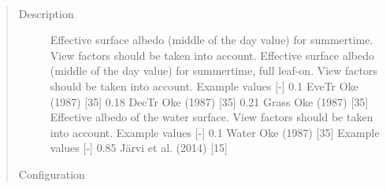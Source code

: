 \documentclass[letterpaper,10pt,english]{sphinxmanual}
\begin{document}
\begin{fulllineitems}
\label{\detokenize{input_files/SUEWS_SiteInfo/Input_Options:cmdoption-arg-albedomax}}~\begin{quote}\begin{description}
\item[{Description}] \leavevmode
Effective surface albedo (middle of the day value) for summertime. View factors should be taken into account. Effective surface albedo (middle of the day value) for summertime, full leaf-on. View factors should be taken into account. Example values {[}-{]} 0.1 EveTr Oke (1987) {[}35{]}  0.18 DecTr Oke (1987) {[}35{]}  0.21 Grass Oke (1987) {[}35{]}  Effective albedo of the water surface. View factors should be taken into account. Example values {[}-{]} 0.1 Water Oke (1987) {[}35{]}  Example values {[}-{]} 0.85 Järvi et al. (2014) {[}15{]}

\item[{Configuration}] \leavevmode


\end{description}
\end{quote}
\end{fulllineitems}
\end{document}
